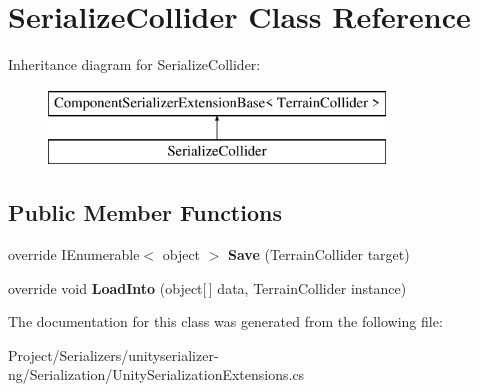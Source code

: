 \hypertarget{class_serialize_collider}{}\section{Serialize\+Collider Class Reference}
\label{class_serialize_collider}
Inheritance diagram for Serialize\+Collider\+:\begin{figure}[H]
\begin{center}
\leavevmode
\includegraphics[height=2.000000cm]{class_serialize_collider}
\end{center}
\end{figure}
\subsection*{Public Member Functions}
\begin{DoxyCompactItemize}
\item 
\mbox{\label{class_serialize_collider_af8330f26c986a715cb6bad3a1e018d77}} 
override I\+Enumerable$<$ object $>$ {\bfseries Save} (Terrain\+Collider target)
\item 
\mbox{\label{class_serialize_collider_ac18a5c1da6864b2a473e4741a832dc53}} 
override void {\bfseries Load\+Into} (object\mbox{[}$\,$\mbox{]} data, Terrain\+Collider instance)
\end{DoxyCompactItemize}


The documentation for this class was generated from the following file\+:\begin{DoxyCompactItemize}
\item 
Project/\+Serializers/unityserializer-\/ng/\+Serialization/Unity\+Serialization\+Extensions.\+cs\end{DoxyCompactItemize}
